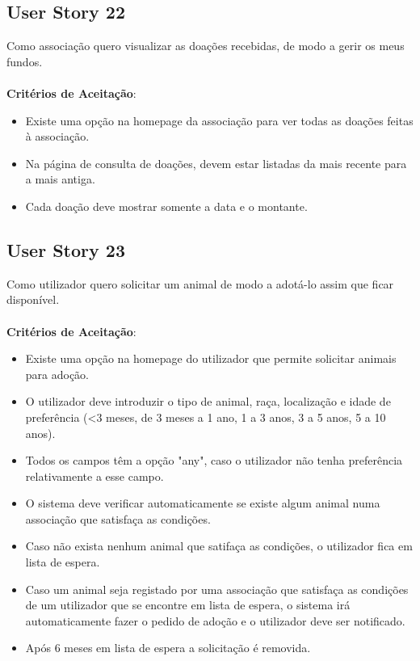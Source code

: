 \documentclass[a4paper,11pt]{article}
\begin{document}
\subsection{User Story 22}
Como associação quero visualizar as doações recebidas, de modo a gerir os meus fundos.\\\\
\textbf{Critérios de Aceitação}:
\begin{itemize}
  \item Existe uma opção na homepage da associação para ver todas as doações feitas à associação.
  \item Na página de consulta de doações, devem estar listadas da mais recente para a mais antiga.
  \item Cada doação deve mostrar somente a data e o montante.
\end{itemize}

\subsection{User Story 23}
Como utilizador quero solicitar um animal de modo a adotá-lo assim que ficar disponível.\\\\
\textbf{Critérios de Aceitação}:
\begin{itemize}
  \item Existe uma opção na homepage do utilizador que permite solicitar animais para adoção.
  \item O utilizador deve introduzir o tipo de animal, raça, localização e idade de preferência (<3 meses, de 3 meses a 1 ano, 1 a 3 anos, 3 a 5 anos, 5 a 10 anos).
  \item Todos os campos têm a opção "any", caso o utilizador não tenha preferência relativamente a esse campo.
  \item O sistema deve verificar automaticamente se existe algum animal numa associação que satisfaça as condições.
  \item Caso não exista nenhum animal que satifaça as condições, o utilizador fica em lista de espera.
  \item Caso um animal seja registado por uma associação que satisfaça as condições de um utilizador que se encontre em lista de espera, o sistema irá automaticamente fazer o pedido de adoção e o utilizador deve ser notificado.
  \item Após 6 meses em lista de espera a solicitação é removida.
\end{itemize}
\end{document}
